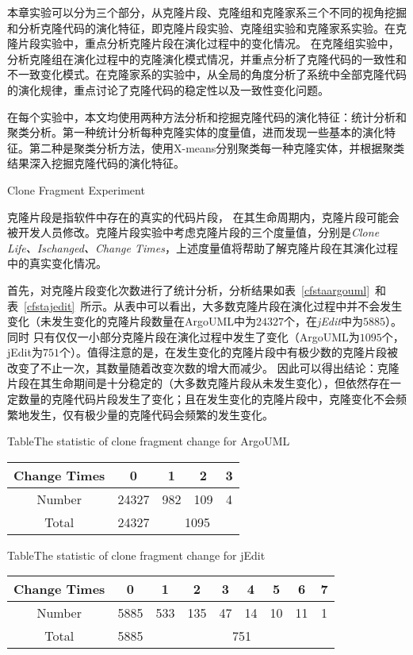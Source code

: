 本章实验可以分为三个部分，从克隆片段、克隆组和克隆家系三个不同的视角挖掘和分析克隆代码的演化特征，即克隆片段实验、克隆组实验和克隆家系实验。在克隆片段实验中，重点分析克隆片段在演化过程中的变化情况。 在克隆组实验中，分析克隆组在演化过程中的克隆演化模式情况，并重点分析了克隆代码的一致性和不一致变化模式。在克隆家系的实验中，从全局的角度分析了系统中全部克隆代码的演化规律，重点讨论了克隆代码的稳定性以及一致性变化问题。

在每个实验中，本文均使用两种方法分析和挖掘克隆代码的演化特征：统计分析和聚类分析。第一种统计分析每种克隆实体的度量值，进而发现一些基本的演化特征。第二种是聚类分析方法，使用{X-means}分别聚类每一种克隆实体，并根据聚类结果深入挖掘克隆代码的演化特征。

{Clone Fragment Experiment}

克隆片段是指软件中存在的真实的代码片段， 在其生命周期内，克隆片段可能会被开发人员修改。克隆片段实验中考虑克隆片段的三个度量值，分别是{\em Clone Life、Ischanged、Change Times}，上述度量值将帮助了解克隆片段在其演化过程中的真实变化情况。

首先，对克隆片段变化次数进行了统计分析，分析结果如表~\ref{cfstaargouml}~和表~\ref{cfstajedit}~所示。从表中可以看出，大多数克隆片段在演化过程中并不会发生变化（未发生变化的克隆片段数量在{ArgoUML}中为$24327$个，在{\em  jEdit}中为$5885$）。同时 只有仅仅一小部分克隆片段在演化过程中发生了变化（{ArgoUML}为$1095$个，{jEdit}为$751$个）。值得注意的是，在发生变化的克隆片段中有极少数的克隆片段被改变了不止一次，其数量随着改变次数的增大而减少。 因此可以得出结论：{克隆片段在其生命期间是十分稳定的（大多数克隆片段从未发生变化），但依然存在一定数量的克隆代码片段发生了变化；且在发生变化的克隆片段中，克隆变化不会频繁地发生，仅有极少量的克隆代码会频繁的发生变化。}

\begin{table}[htbp]
{Table$\!$}{The statistic of clone fragment change for ArgoUML}
\vspace{0.5em}
\centering
\wuhao
\begin{tabular}{ccccc}
\toprule[1.5pt]
Change Times&0&1&2&3\\ 
\midrule[1pt]
Number&24327&982&109&4\\ 
Total&24327&\multicolumn{3}{c}{1095} \\
\bottomrule[1.5pt]
\end{tabular}
\end{table}

\begin{table}[htbp]
{Table$\!$}{The statistic of clone fragment change for jEdit}
\vspace{0.5em}
\centering
\wuhao
\begin{tabular}{ccccccccc}
\toprule[1.5pt]
Change Times &0&1&2&3&4&5&6&7\\ 
\midrule[1pt]
Number&5885&533&135&47&14&10&11&1\\ 
Total&5885&\multicolumn{7}{c}{751}   \\ 
\bottomrule[1.5pt]
\end{tabular}
\end{table}

